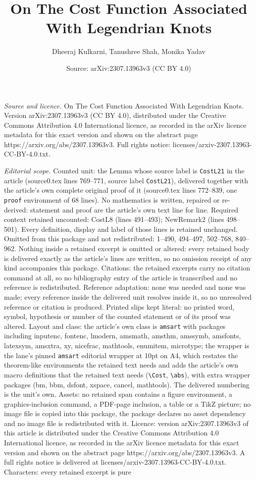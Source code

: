 \documentclass[10pt,a4paper]{amsart}
\title[On The Cost Function Associated With Legendrian Knots]{On The Cost Function Associated With Legendrian Knots}
\author{Dheeraj Kulkarni, Tanushree Shah, Monika Yadav}
\date{Source: arXiv:2307.13963v3 (CC BY 4.0)}
\begin{document}
\maketitle

\noindent\emph{Source and licence.} On The Cost Function Associated With Legendrian Knots. Version arXiv:2307.13963v3 (CC BY 4.0), distributed under the Creative Commons Attribution 4.0 International licence, as recorded in the arXiv licence metadata for this exact version and shown on the abstract page https://arxiv.org/abs/2307.13963v3. Full rights notice: licenses/arxiv-2307.13963-CC-BY-4.0.txt.\par\smallskip

\noindent\textit{Editorial scope.} Counted unit: the Lemma whose source label is \texttt{CostL21} in the article (source0.tex lines 769--771, source label \texttt{CostL21}), delivered together with the article's own complete original proof of it (source0.tex lines 772--839, one \texttt{proof} environment of 68 lines). No mathematics is written, repaired or re-derived: statement and proof are the article's own text line for line. Required context retained uncounted: CostL8 (lines 491--493); NewRemark2 (lines 498--501). Every definition, display and label of those lines is retained unchanged. Omitted from this package and not redistributed: 1--490, 494--497, 502--768, 840--962. Nothing inside a retained excerpt is omitted or altered: every retained body is delivered exactly as the article's lines are written, so no omission receipt of any kind accompanies this package. Citations: the retained excerpts carry no citation command at all, so no bibliography entry of the article is transcribed and no reference is redistributed. Reference adaptation: none was needed and none was made; every reference inside the delivered unit resolves inside it, so no unresolved reference or citation is produced. Printed slips kept literal: no printed word, symbol, hypothesis or number of the counted statement or of its proof was altered. Layout and class: the article's own class is \texttt{amsart} with packages including inputenc, fontenc, lmodern, amsmath, amsthm, amssymb, amsfonts, latexsym, amsxtra, xy, nicefrac, mathtools, enumitem, microtype; the wrapper is the lane's pinned \texttt{amsart} editorial wrapper at 10pt on A4, which restates the theorem-like environments the retained text needs and adds the article's own macro definitions that the retained text needs (\texttt{\textbackslash Cost}, \texttt{\textbackslash abs}), with extra wrapper packages (bm, bbm, dsfont, xspace, cancel, mathtools). The delivered numbering is the unit's own. Assets: no retained span contains a figure environment, a graphics-inclusion command, a PDF-page inclusion, a table or a TikZ picture; no image file is copied into this package, the package declares no asset dependency and no image file is redistributed with it. Licence: version arXiv:2307.13963v3 of this article is distributed under the Creative Commons Attribution 4.0 International licence, as recorded in the arXiv licence metadata for this exact version and shown on the abstract page https://arxiv.org/abs/2307.13963v3. A full rights notice is delivered at licenses/arxiv-2307.13963-CC-BY-4.0.txt. Characters: every retained excerpt is pure 
\end{document}
